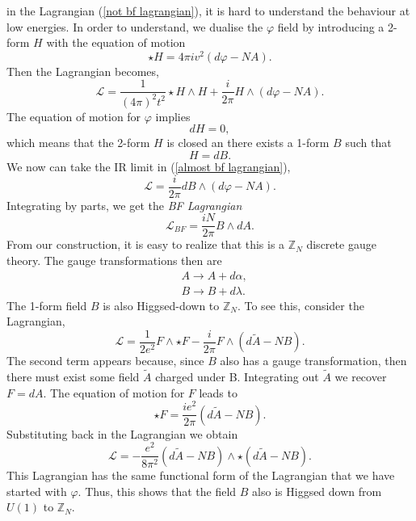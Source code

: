 \documentclass{article}
\begin{document}
in the Lagrangian (\ref{not bf lagrangian}), it is hard to understand the behaviour at low energies. In order to understand, we dualise the $\varphi$ field by introducing a 2-form $H$ with the equation of motion 
\begin{equation}
	\star H=4\pi iv^2(d\varphi-NA).
\end{equation}
Then the Lagrangian becomes, 
\begin{equation}\label{almost bf lagrangian}
	\mathcal{L}=\frac{1}{(4\pi)^2t^2}\star H\wedge H+\frac{i}{2\pi}H\wedge(d\varphi-NA).
\end{equation}
The equation of motion for $\varphi$ implies 
\begin{equation}
	dH=0,
\end{equation}
which means that the 2-form $H$ is closed an there exists a 1-form $B$ such that 
\begin{equation}
	H=dB. 
\end{equation}
We now can take the IR limit in (\ref{almost bf lagrangian}), 
\begin{equation}
	\mathcal{L}=\frac{i}{2\pi}dB\wedge(d\varphi-NA).
\end{equation}
Integrating by parts, we get the \textit{BF Lagrangian}
\begin{equation}
	\mathcal{L}_{BF}=\frac{iN}{2\pi}B\wedge dA. 
\end{equation}
From our construction, it is easy to realize that this is a $\mathbb{Z}_N$ discrete gauge theory. The gauge transformations then are 
\begin{align}
	&A\to A+d\alpha,\\
	&B\to B+d\lambda.
\end{align}
The 1-form field $B$ is also Higgsed-down to $\mathbb{Z}_N$. To see this, consider the Lagrangian, 
\begin{equation}
	\mathcal{L}=\frac{1}{2e^2}F\wedge\star F-\frac{i}{2\pi}F\wedge(d\tilde{A}-NB).
\end{equation}
The second term appears because, since $B$ also has a gauge transformation, then there must exist some field $\tilde{A}$ charged under B. Integrating out $\tilde{A}$ we recover $F=dA$. The equation of motion for $F$ leads to 
\begin{equation}
	\star F=\frac{ie^2}{2\pi}(d\tilde{A}-NB).
\end{equation}
Substituting back in the Lagrangian we obtain 
\begin{equation}
	\mathcal{L}=-\frac{e^2}{8\pi^2}(d\tilde{A}-NB)\wedge\star(d\tilde{A}-NB).
\end{equation}
This Lagrangian has the same functional form of the Lagrangian that we have started with $\varphi$. Thus, this shows that the field $B$ also is Higgsed down from $U(1)$ to $\mathbb{Z}_N$. 
\end{document}
